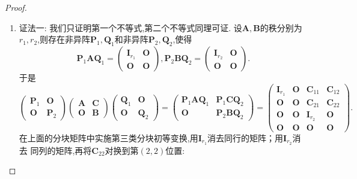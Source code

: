 \documentclass[lang=cn,newtx,10pt,scheme=chinese]{elegantbook}
\begin{document}
\begin{proof}
\begin{enumerate}[(1)]
    \item  {\color{blue}证法一:} 我们只证明第一个不等式,第二个不等式同理可证. 设\(\boldsymbol{A},\boldsymbol{B}\)的秩分别为\(r_1,r_2\),则存在非异阵\(\boldsymbol{P}_1,\boldsymbol{Q}_1\)和非异阵\(\boldsymbol{P}_2,\boldsymbol{Q}_2\),使得
    \[
    \boldsymbol{P}_1\boldsymbol{A}\boldsymbol{Q}_1=\begin{pmatrix}
    \boldsymbol{I}_{r_1}&\boldsymbol{O}\\
    \boldsymbol{O}&\boldsymbol{O}
    \end{pmatrix}, \boldsymbol{P}_2\boldsymbol{B}\boldsymbol{Q}_2=\begin{pmatrix}
    \boldsymbol{I}_{r_2}&\boldsymbol{O}\\
    \boldsymbol{O}&\boldsymbol{O}
    \end{pmatrix}.
    \]
    于是
    \[
    \begin{pmatrix}
    \boldsymbol{P}_1&\boldsymbol{O}\\
    \boldsymbol{O}&\boldsymbol{P}_2
    \end{pmatrix}
    \begin{pmatrix}
    \boldsymbol{A}&\boldsymbol{C}\\
    \boldsymbol{O}&\boldsymbol{B}
    \end{pmatrix}
    \begin{pmatrix}
    \boldsymbol{Q}_1&\boldsymbol{O}\\
    \boldsymbol{O}&\boldsymbol{Q}_2
    \end{pmatrix}=
    \begin{pmatrix}
    \boldsymbol{P}_1\boldsymbol{A}\boldsymbol{Q}_1&\boldsymbol{P}_1\boldsymbol{C}\boldsymbol{Q}_2\\
    \boldsymbol{O}&\boldsymbol{P}_2\boldsymbol{B}\boldsymbol{Q}_2
    \end{pmatrix}=
    \begin{pmatrix}
    \boldsymbol{I}_{r_1}&\boldsymbol{O}&\boldsymbol{C}_{11}&\boldsymbol{C}_{12}\\
    \boldsymbol{O}&\boldsymbol{O}&\boldsymbol{C}_{21}&\boldsymbol{C}_{22}\\
    \boldsymbol{O}&\boldsymbol{O}&\boldsymbol{I}_{r_2}&\boldsymbol{O}\\
    \boldsymbol{O}&\boldsymbol{O}&\boldsymbol{O}&\boldsymbol{O}
    \end{pmatrix}.
    \]
    在上面的分块矩阵中实施第三类分块初等变换,用\(\boldsymbol{I}_{r_1}\)消去同行的矩阵；用\(\boldsymbol{I}_{r_2}\)消去
    同列的矩阵,再将\(\boldsymbol{C}_{22}\)对换到第\((2,2)\)位置:

\end{enumerate}
\end{proof}
\end{document}
